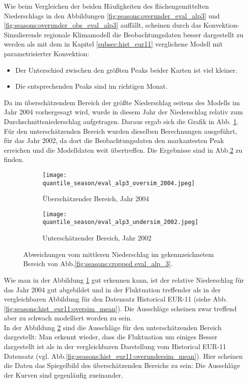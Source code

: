 Wie beim Vergleichen der beiden Häufigkeiten des flächengemittelten Niederschlags in den Abbildungen \ref{fig:seasons:overunder_eval_alp3} und \ref{fig:seasons:overunder_obs_eval_alp3} auffällt, scheinen durch das Konvektion-Simulierende regionale Klimamodell die Beobachtungsdaten besser dargestellt zu werden als mit dem in Kapitel \ref{subsec:hist_eur11} verglichene Modell mit parametrisierter Konvektion:
\begin{itemize}
	\item Der Unterschied zwischen den größten Peaks beider Karten ist viel kleiner.
	\item Die entsprechenden Peaks sind im richtigen Monat.
\end{itemize}
Da im überschätzendem Bereich der größte Niederschlag seitens des Modells im Jahr 2004 vorhergesagt wird, wurde in diesem Jahr der Niederschlag relativ zum Durchschnittsniederschlag aufgetragen. Daraus ergab sich die Grafik in Abb. \ref{fig:seasons:pr_oversim_eval_alp3}.\\
Für den unterschätzenden Bereich wurden dieselben Berechnungen ausgeführt, für das Jahr 2002, da dort die Beobachtungsdaten den markantesten Peak erreichen und die Modelldaten weit übertreffen. Die Ergebnisse sind in Abb.\ref{fig:seasons:pr_undersim_eval_alp3} zu finden.\\
\begin{figure}[h!]
	\begin{subfigure}{0.49\textwidth}
		\texttt{[image: quantile\_season/eval\_alp3\_oversim\_2004.jpeg]}
		\caption{Überschätzender Bereich, Jahr 2004}
		\label{fig:seasons:pr_oversim_eval_alp3}
	\end{subfigure}
	\begin{subfigure}{0.49\textwidth}
		\texttt{[image: quantile\_season/eval\_alp3\_undersim\_2002.jpeg]}
		\caption{Unterschätzender Bereich, Jahr 2002}
		\label{fig:seasons:pr_undersim_eval_alp3}
	\end{subfigure}
	\caption{Abweichungen vom mittleren Niederschlag im gekennzeichnetem Bereich von Abb.\ref{fig:seasons:cropped eval_alp_3}.}
	\label{fig:seasons:pr_over_undersim_eval_alp3}
\end{figure}

Wie man in der Abbildung \ref{fig:seasons:pr_oversim_eval_alp3} gut erkennen kann, ist der relative Niederschlag für das Jahr 2004 gut abgebildet und in der Fluktuation treffender als in der vergleichbaren Abbildung  für den Datensatz Historical EUR-11 (siehe Abb.\ref{fig:seasons:hist_eur11:oversim_mean}). Die Ausschläge scheinen zwar treffend aber zu schwach modelliert worden zu sein.\\
In der Abbildung \ref{fig:seasons:pr_undersim_eval_alp3} sind die Ausschläge für den unterschätzenden Bereich dargestellt: Man erkennt wieder, dass die Fluktuation um einiges Besser dargestellt ist als in der vergleichbaren Darstellung vom Historical EUR-11 Datensatz (vgl. Abb.\ref{fig:seasons:hist_eur11:overundersim_mean}). Hier scheinen die Daten das Spiegelbild des überschätzenden Bereichs zu sein: Die Ausschläge der Kurven sind gegenläufig zueinander.

